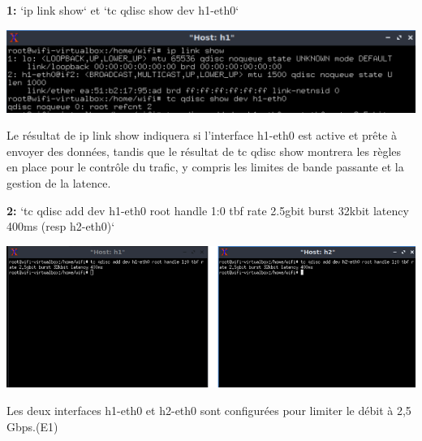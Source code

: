 \vspace{0.5cm}
\hspace{0.5cm}\textbf{1:} `ip link show` et `tc qdisc show dev h1-eth0`
\begin{center}
    \includegraphics[width=1\textwidth]{./images/ShowDefaultQdisc.png}
\end{center}
Le résultat de ip link show indiquera si l'interface h1-eth0 est active et prête à envoyer des données, tandis que le résultat de tc qdisc show montrera les règles en place pour le contrôle du trafic, y compris les limites de bande passante et la gestion de la latence. 

\vspace{1cm}

\textbf{2:} `tc qdisc add dev h1-eth0 root handle 1:0 tbf rate 2.5gbit burst 32kbit latency 400ms (resp h2-eth0)`
\begin{center}
    \includegraphics[width=1\textwidth]{./images/1smaller.png}
\end{center}
Les deux interfaces h1-eth0 et h2-eth0 sont configurées pour limiter le débit à 2,5 Gbps.(E1)

